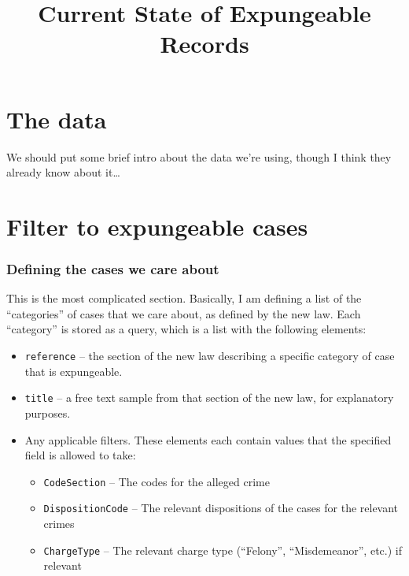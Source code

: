 \documentclass[
]{article}
\title{Current State of Expungeable Records}
\author{}
\date{\vspace{-2.5em}}
\providecommand{\tightlist}{%
  \setlength{\itemsep}{0pt}\setlength{\parskip}{0pt}}
\begin{document}
\maketitle

\hypertarget{the-data}{%
\section{The data}\label{the-data}}

We should put some brief intro about the data we're using, though I
think they already know about it\ldots{}

\hypertarget{filter-to-expungeable-cases}{%
\section{Filter to expungeable
cases}\label{filter-to-expungeable-cases}}

\hypertarget{defining-the-cases-we-care-about}{%
\subsubsection{Defining the cases we care
about}\label{defining-the-cases-we-care-about}}

This is the most complicated section. Basically, I am defining a list of
the ``categories'' of cases that we care about, as defined by the new
law. Each ``category'' is stored as a query, which is a list with the
following elements:

\begin{itemize}
\tightlist
\item
  \texttt{reference} -- the section of the new law describing a specific
  category of case that is expungeable.
\item
  \texttt{title} -- a free text sample from that section of the new law,
  for explanatory purposes.
\item
  Any applicable filters. These elements each contain values that the
  specified field is allowed to take:

  \begin{itemize}
  \tightlist
  \item
    \texttt{CodeSection} -- The codes for the alleged crime
  \item
    \texttt{DispositionCode} -- The relevant dispositions of the cases
    for the relevant crimes
  \item
    \texttt{ChargeType} -- The relevant charge type (``Felony'',
    ``Misdemeanor'', etc.) if relevant
  \end{itemize}
\end{itemize}
\end{document}
